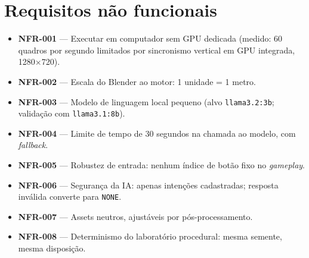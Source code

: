 \section*{Requisitos não funcionais}
\label{ap:nfr}
\begin{itemize}
  \item \textbf{NFR-001} --- Executar em computador sem GPU dedicada
  (medido: 60 quadros por segundo limitados por sincronismo vertical em GPU
  integrada, 1280$\times$720).
  \item \textbf{NFR-002} --- Escala do Blender ao motor: 1 unidade = 1 metro.
  \item \textbf{NFR-003} --- Modelo de linguagem local pequeno (alvo
  \texttt{llama3.2:3b}; validação com \texttt{llama3.1:8b}).
  \item \textbf{NFR-004} --- Limite de tempo de 30 segundos na chamada ao
  modelo, com \emph{fallback}.
  \item \textbf{NFR-005} --- Robustez de entrada: nenhum índice de botão fixo
  no \emph{gameplay}.
  \item \textbf{NFR-006} --- Segurança da IA: apenas intenções cadastradas;
  resposta inválida converte para \texttt{NONE}.
  \item \textbf{NFR-007} --- Assets neutros, ajustáveis por pós-processamento.
  \item \textbf{NFR-008} --- Determinismo do laboratório procedural: mesma
  semente, mesma disposição.
\end{itemize}

